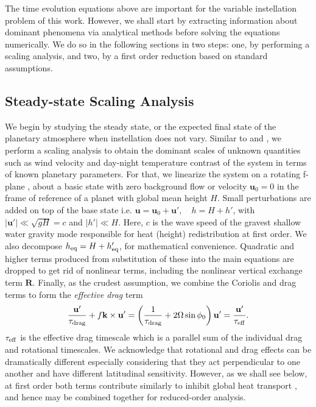 \documentclass[trackchanges,twocolumn]{aastex7}
\begin{document}
The time evolution equations above are important for the variable instellation problem of this work. However, we shall start by extracting information about dominant phenomena via analytical methods before solving the equations numerically. We do so in the following sections in two steps: one, by performing a scaling analysis, and two, by a first order reduction based on standard assumptions.

\subsection{Steady-state Scaling Analysis} \label{sec:steady_scaling}



We begin by studying the steady state, or the expected final state of the planetary atmosphere when instellation does not vary. Similar to \cite{banik2025meridional} and \cite{vallis2017atmospheric}, we perform a scaling analysis to obtain the dominant scales of unknown quantities such as wind velocity and day-night temperature contrast of the system in terms of known planetary parameters. For that, we linearize the system on a rotating f-plane \citep{vallis2017atmospheric}, about a basic state with zero background flow or velocity $\mathbf{u}_0 = 0$ in the frame of reference of a planet with global mean height $H$. Small perturbations are added on top of the base state i.e.  $\mathbf{u} = \mathbf{u}_0 + \mathbf{u}', \quad h = H + h'$, with $|\mathbf{u}'|\ll \sqrt{gH} = c$ and $|h'|\ll H$. Here, $c$ is the wave speed of the gravest shallow water gravity mode responsible for heat (height) redistribution at first order. We also decompose $h_{\rm eq} = H + h_{\rm eq}'$, for mathematical convenience. Quadratic and higher terms produced from substitution of these into the main equations are dropped to get rid of nonlinear terms, including the nonlinear vertical exchange term $\textbf{R}$. Finally, as the crudest assumption, we combine the Coriolis and drag terms to form the \textit{effective drag} term
\begin{equation}
    \frac{\mathbf{u}'}{\tau_{\rm drag}} + f\mathbf{k}\times \mathbf{u}' = \left(\frac{1}{\tau_{\rm drag}} + 2\Omega \sin \phi_0\right) \mathbf{u}' = \frac{\mathbf{u}'}{\tau_{\rm eff}}.
\end{equation}
$\tau_{\rm eff}$ is the effective drag timescale which is a parallel sum of the individual drag and rotational timescales. We acknowledge that rotational and drag effects can be dramatically different especially considering that they act perpendicular to one another and have different latitudinal sensitivity. However, as we shall see below, at first order both terms contribute similarly to inhibit global heat transport \citep{perez2013atmospheric,Banik2025}, and hence may be combined together for reduced-order analysis.
    
\end{document}
